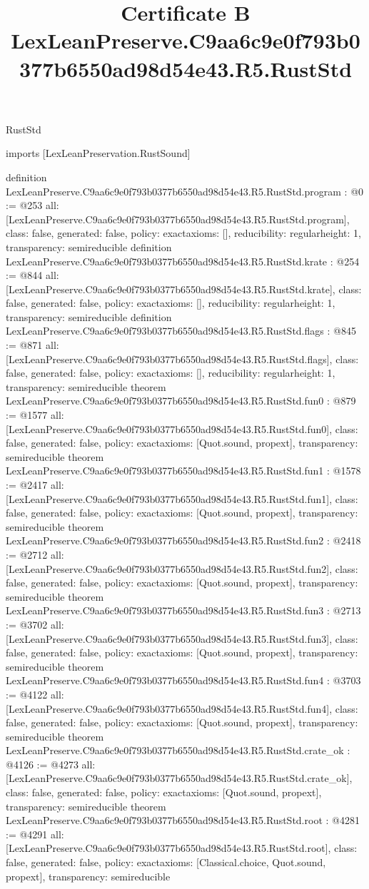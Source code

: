 \begin{lexlean}{RustStd}
\title{Certificate B LexLeanPreserve.C9aa6c9e0f793b0377b6550ad98d54e43.R5.RustStd}
\begin{coremodule}
imports [LexLeanPreservation.RustSound]

definition LexLeanPreserve.C9aa6c9e0f793b0377b6550ad98d54e43.R5.RustStd.program : @0 := @253 {
  all: [LexLeanPreserve.C9aa6c9e0f793b0377b6550ad98d54e43.R5.RustStd.program],
  class: false,
  generated: false,
  policy: exact{axioms: []},
  reducibility: regular{height: 1},
  transparency: semireducible
}
definition LexLeanPreserve.C9aa6c9e0f793b0377b6550ad98d54e43.R5.RustStd.krate : @254 := @844 {
  all: [LexLeanPreserve.C9aa6c9e0f793b0377b6550ad98d54e43.R5.RustStd.krate],
  class: false,
  generated: false,
  policy: exact{axioms: []},
  reducibility: regular{height: 1},
  transparency: semireducible
}
definition LexLeanPreserve.C9aa6c9e0f793b0377b6550ad98d54e43.R5.RustStd.flags : @845 := @871 {
  all: [LexLeanPreserve.C9aa6c9e0f793b0377b6550ad98d54e43.R5.RustStd.flags],
  class: false,
  generated: false,
  policy: exact{axioms: []},
  reducibility: regular{height: 1},
  transparency: semireducible
}
theorem LexLeanPreserve.C9aa6c9e0f793b0377b6550ad98d54e43.R5.RustStd.fun0 : @879 := @1577 {
  all: [LexLeanPreserve.C9aa6c9e0f793b0377b6550ad98d54e43.R5.RustStd.fun0],
  class: false,
  generated: false,
  policy: exact{axioms: [Quot.sound, propext]},
  transparency: semireducible
}
theorem LexLeanPreserve.C9aa6c9e0f793b0377b6550ad98d54e43.R5.RustStd.fun1 : @1578 := @2417 {
  all: [LexLeanPreserve.C9aa6c9e0f793b0377b6550ad98d54e43.R5.RustStd.fun1],
  class: false,
  generated: false,
  policy: exact{axioms: [Quot.sound, propext]},
  transparency: semireducible
}
theorem LexLeanPreserve.C9aa6c9e0f793b0377b6550ad98d54e43.R5.RustStd.fun2 : @2418 := @2712 {
  all: [LexLeanPreserve.C9aa6c9e0f793b0377b6550ad98d54e43.R5.RustStd.fun2],
  class: false,
  generated: false,
  policy: exact{axioms: [Quot.sound, propext]},
  transparency: semireducible
}
theorem LexLeanPreserve.C9aa6c9e0f793b0377b6550ad98d54e43.R5.RustStd.fun3 : @2713 := @3702 {
  all: [LexLeanPreserve.C9aa6c9e0f793b0377b6550ad98d54e43.R5.RustStd.fun3],
  class: false,
  generated: false,
  policy: exact{axioms: [Quot.sound, propext]},
  transparency: semireducible
}
theorem LexLeanPreserve.C9aa6c9e0f793b0377b6550ad98d54e43.R5.RustStd.fun4 : @3703 := @4122 {
  all: [LexLeanPreserve.C9aa6c9e0f793b0377b6550ad98d54e43.R5.RustStd.fun4],
  class: false,
  generated: false,
  policy: exact{axioms: [Quot.sound, propext]},
  transparency: semireducible
}
theorem LexLeanPreserve.C9aa6c9e0f793b0377b6550ad98d54e43.R5.RustStd.crate_ok : @4126 := @4273 {
  all: [LexLeanPreserve.C9aa6c9e0f793b0377b6550ad98d54e43.R5.RustStd.crate_ok],
  class: false,
  generated: false,
  policy: exact{axioms: [Quot.sound, propext]},
  transparency: semireducible
}
theorem LexLeanPreserve.C9aa6c9e0f793b0377b6550ad98d54e43.R5.RustStd.root : @4281 := @4291 {
  all: [LexLeanPreserve.C9aa6c9e0f793b0377b6550ad98d54e43.R5.RustStd.root],
  class: false,
  generated: false,
  policy: exact{axioms: [Classical.choice, Quot.sound, propext]},
  transparency: semireducible
}


\end{coremodule}
\end{lexlean}

